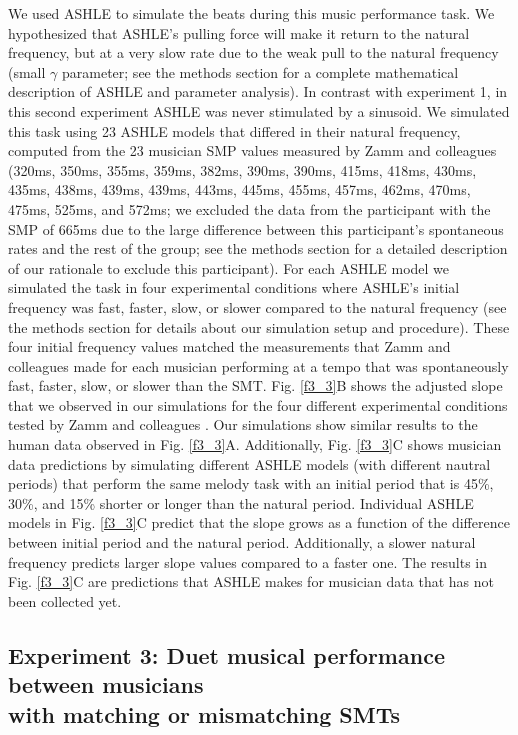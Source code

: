 \documentclass{report}
\begin{document}
We used ASHLE to simulate the beats during this music performance task. We hypothesized that ASHLE's pulling force will make it return to the natural frequency, but at a very slow rate due to the weak pull to the natural frequency (small $\gamma$ parameter; see the methods section for a complete mathematical description of ASHLE and parameter analysis). In contrast with experiment 1, in this second experiment ASHLE was never stimulated by a sinusoid. We simulated this task using 23 ASHLE models that differed in their natural frequency, computed from the 23 musician SMP values measured by Zamm and colleagues \cite{zamm2018musicians} (320ms, 350ms, 355ms, 359ms, 382ms, 390ms, 390ms, 415ms, 418ms, 430ms, 435ms, 438ms, 439ms, 439ms, 443ms, 445ms, 455ms, 457ms, 462ms, 470ms, 475ms, 525ms, and 572ms; we excluded the data from the participant with the SMP of 665ms due to the large difference between this participant's spontaneous rates and the rest of the group; see the methods section for a detailed description of our rationale to exclude this participant). For each ASHLE model we simulated the task in four experimental conditions where ASHLE's initial frequency was fast, faster, slow, or slower compared to the natural frequency (see the methods section for details about our simulation setup and procedure). These four initial frequency values matched the measurements that Zamm and colleagues \cite{zamm2018musicians} made for each musician performing at a tempo that was spontaneously fast, faster, slow, or slower than the SMT. Fig.{} \ref{f3_3}B shows the adjusted slope that we observed in our simulations for the four different experimental conditions tested by Zamm and colleagues \cite{zamm2018musicians}. Our simulations show similar results to the human data observed in Fig.{} \ref{f3_3}A. Additionally, Fig.{} \ref{f3_3}C shows musician data predictions by simulating different ASHLE models (with different nautral periods) that perform the same melody task with an initial period that is 45\%, 30\%, and 15\% shorter or longer than the natural period. Individual ASHLE models in Fig.{} \ref{f3_3}C predict that the slope grows as a function of the difference between initial period and the natural period. Additionally, a slower natural frequency predicts larger slope values compared to a faster one. The results in Fig.{} \ref{f3_3}C are predictions that ASHLE makes for musician data that has not been collected yet.

\subsection{Experiment 3: Duet musical performance between musicians \\ with matching or mismatching SMTs}
\end{document}
